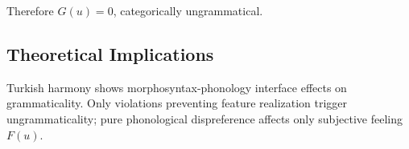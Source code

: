 \documentclass[12pt]{article}
\begin{document}
Therefore $G(u) = 0$, categorically ungrammatical.

\subsection{Theoretical Implications}

Turkish harmony shows morphosyntax-phonology interface effects on grammaticality. Only violations preventing feature realization trigger ungrammaticality; pure phonological dispreference affects only subjective feeling $F(u)$.

 \newpage
\begin{sloppypar}
\printbibliography[title=References]
\end{sloppypar}
\end{document}
